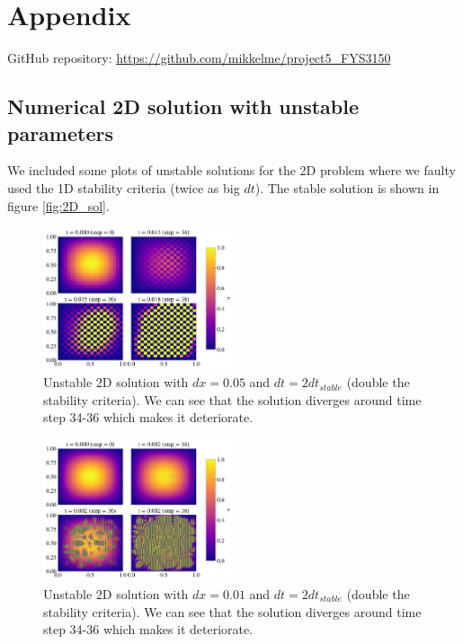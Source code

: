 \documentclass[%
 reprint,
nofootinbib,
aps,
]{revtex4-1}
\begin{document}
%

\clearpage
\section*{Appendix}
GitHub repository: \url{https://github.com/mikkelme/project5_FYS3150}

\subsection{Numerical 2D solution with unstable parameters}\label{sec:2Dunstable}
We included some plots of unstable solutions for the 2D problem where we faulty used the 1D stability criteria (twice as big $dt$). The stable solution is shown in figure \ref{fig:2D_sol}.

\begin{figure}[H]
    \centering
    \includegraphics[width=0.5\textwidth]{figures/2D_unstable0.05.pdf}
    \caption{Unstable 2D solution with $dx = 0.05$ and $dt = 2dt_{stable}$ (double the stability criteria). We can see that the solution diverges around time step 34-36 which makes it deteriorate.}
    \label{fig:2D_unstable0.05}
\end{figure}

\begin{figure}[H]
    \centering
    \includegraphics[width=0.5\textwidth]{figures/2D_unstable0.01.pdf}
    \caption{Unstable 2D solution with $dx = 0.01$ and $dt = 2dt_{stable}$ (double the stability criteria). We can see that the solution diverges around time step 34-36 which makes it deteriorate.}
    \label{fig:2D_unstable0.01}
\end{figure}
\end{document}
